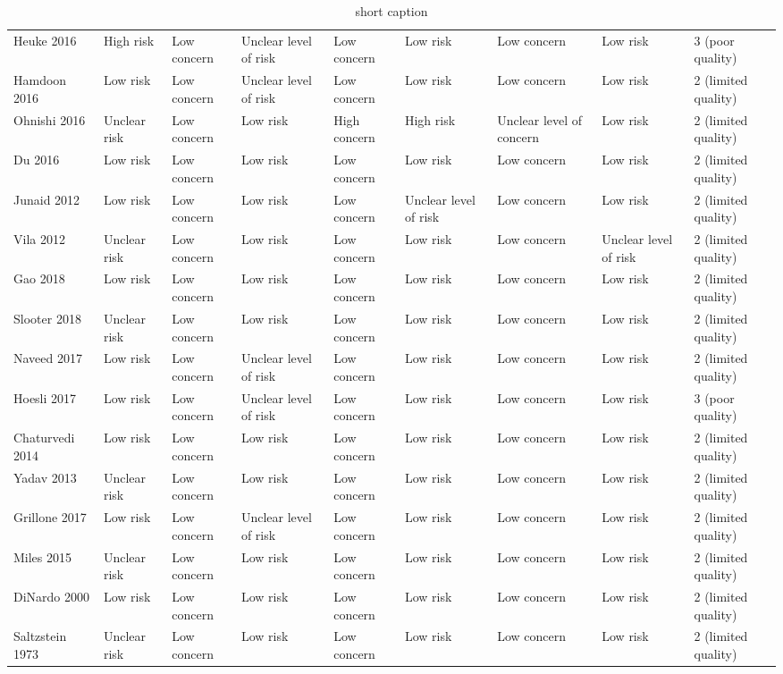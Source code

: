 \begin{table}[ht]
\begin{tabular}{lllllllll}
  Heuke 2016 & High risk & Low concern & Unclear level of risk & Low concern & Low risk & Low concern & Low risk & 3 (poor quality) \\ 
  Hamdoon 2016 & Low risk & Low concern & Unclear level of risk & Low concern & Low risk & Low concern & Low risk & 2 (limited quality) \\ 
  Ohnishi 2016 & Unclear risk & Low concern & Low risk & High concern & High risk & Unclear level of concern & Low risk & 2 (limited quality) \\ 
  Du 2016 & Low risk & Low concern & Low risk & Low concern & Low risk & Low concern & Low risk & 2 (limited quality) \\ 
  Junaid 2012 & Low risk & Low concern & Low risk & Low concern & Unclear level of risk & Low concern & Low risk & 2 (limited quality) \\ 
  Vila 2012 & Unclear risk & Low concern & Low risk & Low concern & Low risk & Low concern & Unclear level of risk & 2 (limited quality) \\ 
  Gao 2018 & Low risk & Low concern & Low risk & Low concern & Low risk & Low concern & Low risk & 2 (limited quality) \\ 
  Slooter 2018 & Unclear risk & Low concern & Low risk & Low concern & Low risk & Low concern & Low risk & 2 (limited quality) \\ 
  Naveed 2017 & Low risk & Low concern & Unclear level of risk & Low concern & Low risk & Low concern & Low risk & 2 (limited quality) \\ 
  Hoesli 2017 & Low risk & Low concern & Unclear level of risk & Low concern & Low risk & Low concern & Low risk & 3 (poor quality) \\ 
  Chaturvedi 2014 & Low risk & Low concern & Low risk & Low concern & Low risk & Low concern & Low risk & 2 (limited quality) \\ 
  Yadav 2013 & Unclear risk & Low concern & Low risk & Low concern & Low risk & Low concern & Low risk & 2 (limited quality) \\ 
  Grillone 2017 & Low risk & Low concern & Unclear level of risk & Low concern & Low risk & Low concern & Low risk & 2 (limited quality) \\ 
  Miles 2015 & Unclear risk & Low concern & Low risk & Low concern & Low risk & Low concern & Low risk & 2 (limited quality) \\ 
  DiNardo 2000 & Low risk & Low concern & Low risk & Low concern & Low risk & Low concern & Low risk & 2 (limited quality) \\ 
  Saltzstein 1973 & Unclear risk & Low concern & Low risk & Low concern & Low risk & Low concern & Low risk & 2 (limited quality) \\ 
   \hline
\end{tabular}
\endgroup
\caption[full caption]{short caption} 
\label{tab:qual_scores}
\end{table}
